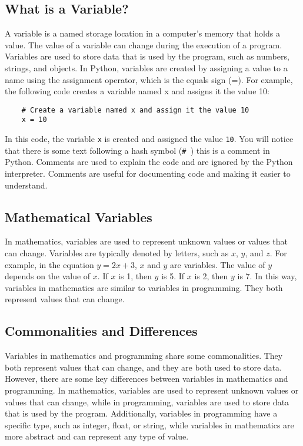 \subsection{What is a Variable?}
A variable is a named storage location in a computer's memory that holds a value. The value of a variable can change during the execution of a program. Variables are used to store data that is used by the program, such as numbers, strings, and objects. In Python, variables are created by assigning a value to a name using the assignment operator, which is the equals sign (=). For example, the following code creates a variable named x and assigns it the value 10:

\begin{lstlisting}
    # Create a variable named x and assign it the value 10
    x = 10
\end{lstlisting}
    
In this code, the variable \lstinline|x| is created and assigned the value \lstinline|10|. You will notice that there is some text following a hash symbol (\lstinline|# |) this is a comment in Python. Comments are used to explain the code and are ignored by the Python interpreter. Comments are useful for documenting code and making it easier to understand.

\subsection{Mathematical Variables}
In mathematics, variables are used to represent unknown values or values that can change. Variables are typically denoted by letters, such as $x$, $y$, and $z$. For example, in the equation $y = 2x + 3$, $x$ and $y$ are variables. The value of $y$ depends on the value of $x$. If $x$ is 1, then $y$ is 5. If $x$ is 2, then $y$ is 7. In this way, variables in mathematics are similar to variables in programming. They both represent values that can change.

\subsection{Commonalities and Differences}
Variables in mathematics and programming share some commonalities. They both represent values that can change, and they are both used to store data. However, there are some key differences between variables in mathematics and programming. In mathematics, variables are used to represent unknown values or values that can change, while in programming, variables are used to store data that is used by the program. Additionally, variables in programming have a specific type, such as integer, float, or string, while variables in mathematics are more abstract and can represent any type of value.

